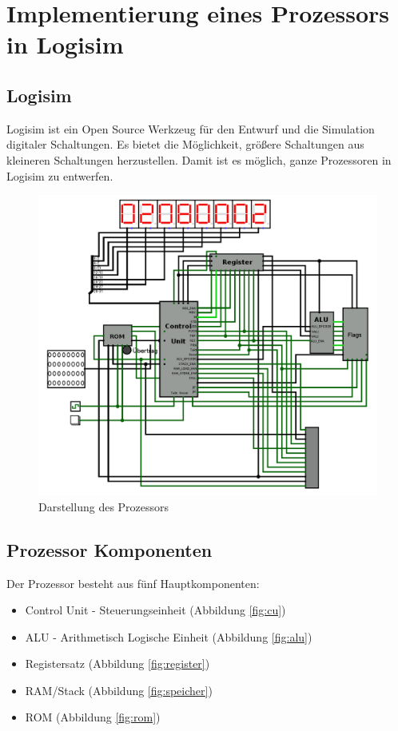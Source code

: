 \documentclass[a4paper,12pt]{article}
\begin{document}
\newpage
\section{Implementierung eines Prozessors in Logisim}
\subsection{Logisim}
Logisim ist ein Open Source Werkzeug für den Entwurf und die Simulation digitaler Schaltungen. Es bietet die Möglichkeit, größere Schaltungen aus kleineren Schaltungen herzustellen. Damit ist es möglich, ganze Prozessoren in Logisim zu entwerfen.

\begin{figure}[!htb]
\centering
\includegraphics[scale=0.30]{cpu}
\caption{Darstellung des Prozessors}
\centering
\label{fig:prozessor}
\end{figure}
\newpage



\subsection{Prozessor Komponenten}
Der Prozessor besteht aus fünf Hauptkomponenten:
\begin{itemize}
\item Control Unit - Steuerungseinheit (Abbildung \ref{fig:cu})
\item ALU - Arithmetisch Logische Einheit (Abbildung \ref{fig:alu})
\item Registersatz (Abbildung \ref{fig:register})
\item RAM/Stack (Abbildung \ref{fig:speicher})
\item ROM (Abbildung \ref{fig:rom})
\end{itemize}
\end{document}
